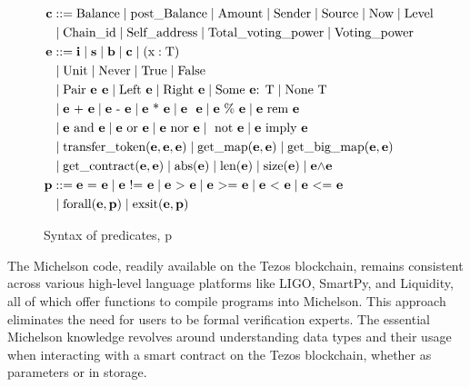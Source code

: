 \documentclass[a4paper,UKenglish,cleveref, autoref, thm-restate]{lipics-v2021}
\begin{document}
\begin{figure}[]
\begin{align*}
\textbf{c} & ::= 
    \text{Balance}
   \mid \text{post\_Balance}  
   \mid \text{Amount} 
   \mid \text{Sender} 
   \mid \text{Source} 
   \mid \text{Now} 
   \mid \text{Level} \\
   &\mid \text{Chain\_id} 
   \mid \text{Self\_address} 
   \mid \text{Total\_voting\_power} 
   \mid \text{Voting\_power} \\
\textbf{e} & :: =  \textbf{i} \mid  \textbf{s}  \mid  \textbf{b} \mid \textbf{c} \mid (\text{x} : \text{T}) \\
&\mid \text{Unit}  \mid \text{Never}  \mid \text{True}  \mid \text{False} \\
&\mid \text{Pair } \textbf{e } \textbf{e}  \mid \text{Left } \textbf{e}  \mid \text{Right } \textbf{e}  \mid \text{Some } \textbf{e} \text{: T} \mid \text{None T}  \\
& \mid \textbf{e} \text{ + } \textbf{e}\mid \textbf{e} \text{ - } \textbf{e}  \mid \textbf{e} \text{ * } \textbf{e} \mid \textbf{e} \text{ \/ } \textbf{e} \mid \textbf{e} \text{ \% } \textbf{e} \mid \textbf{e} \text{ rem } \textbf{e} \\
& \mid \textbf{e} \text{ and } \textbf{e}\mid \textbf{e} \text{ or } \textbf{e}  \mid \textbf{e} \text{ nor } \textbf{e} \mid  \text{ not } \textbf{e} \mid \textbf{e} \text{ imply } \textbf{e} \\
& \mid \text{transfer\_token} (\textbf{e}, \textbf{e}, \textbf{e}) 
 \mid \text{get\_map} (\textbf{e}, \textbf{e}) 
 \mid \text{get\_big\_map} (\textbf{e}, \textbf{e}) \\
& \mid \text{get\_contract} (\textbf{e}, \textbf{e})  
 \mid \text{abs} (\textbf{e})  
 \mid \text{len} (\textbf{e})
 \mid \text{size} (\textbf{e})
\mid \textbf{e} \text{$\wedge$} \textbf{e}  \\
\textbf{p} & :: = \textbf{e} \text{ = } \textbf{e} 
\mid \textbf{e} \text{ != } \textbf{e}
\mid \textbf{e} \text{ > } \textbf{e}
\mid \textbf{e} \text{ >= } \textbf{e}
\mid \textbf{e} \text{ < } \textbf{e}
\mid \textbf{e} \text{ <= } \textbf{e} \\
&\mid \text{forall} (\textbf{e}, \textbf{p})
\mid \text{exsit} (\textbf{e}, \textbf{p})
\end{align*}
\caption{Syntax of predicates, p}
\label{fig:syntax-predicates}
\end{figure}

The Michelson code, readily available on the Tezos blockchain, remains consistent across various high-level language platforms like LIGO, SmartPy, and Liquidity, all of which offer functions to compile programs into Michelson. This approach eliminates the need for users to be formal verification experts. The essential Michelson knowledge revolves around understanding data types and their usage when interacting with a smart contract on the Tezos blockchain, whether as parameters or in storage.
\end{document}
